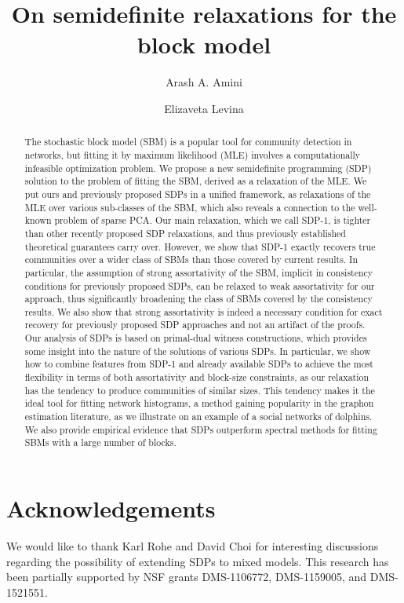 \documentclass[11pt]{article}
\title{On semidefinite relaxations for the block model}
\author{Arash A. Amini}
\author{Elizaveta Levina}
\affil{Department of Statistics, UCLA and \\
        Department of Statistics, University of Michigan}
\numberwithin{equation}{section}
\theoremstyle{plain}
\theoremstyle{definition}
\begin{document}
\maketitle

\begin{abstract}
	The stochastic block model (SBM) is a popular tool for community
	detection in networks, but fitting it by maximum likelihood (MLE)
	involves a computationally infeasible optimization problem.  We propose a new
	semidefinite programming (SDP) solution to the problem of fitting the
	SBM, derived as a relaxation of the MLE.   We put ours and previously proposed SDPs in a unified framework, as relaxations of the MLE over various sub-classes of the SBM, which also reveals a connection to the well-known problem of sparse PCA.      Our main relaxation, which we call SDP-1, is tighter
	than other recently proposed SDP relaxations, and thus previously
	established theoretical guarantees carry over. However, we show that SDP-1 exactly recovers true communities over a wider class of SBMs than those covered by current results. In particular, the assumption of strong assortativity of the SBM, implicit in consistency conditions for previously proposed SDPs, can be relaxed to weak assortativity for our approach, thus significantly broadening the class of SBMs covered by the  consistency results.  
	We also show that strong assortativity is indeed a necessary condition for exact recovery for previously proposed SDP approaches and not an artifact of the proofs.  Our analysis of SDPs is based on primal-dual witness constructions, which provides some insight into the nature of the solutions of various SDPs. In particular, we show how to combine features from SDP-1 and already available SDPs to achieve the most flexibility in terms of both assortativity and block-size constraints, as our relaxation has the tendency to produce communities of similar sizes.    This tendency makes it the ideal
	tool for fitting network histograms,  a method gaining popularity in the graphon estimation literature, as we illustrate on an example of a social networks of dolphins. We also provide empirical evidence that SDPs outperform spectral methods for fitting SBMs with a large number of blocks.

\end{abstract}








\section*{Acknowledgements}
We would like to thank Karl Rohe and David Choi for interesting discussions regarding the possibility of extending SDPs to mixed models. This research has been partially supported by NSF grants DMS-1106772, DMS-1159005, and DMS-1521551.








\end{document}
